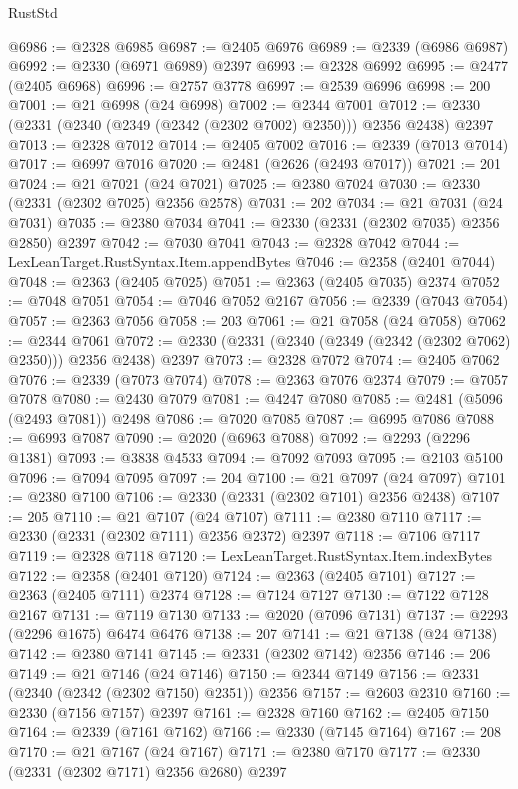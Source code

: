 \begin{lexlean}{RustStd}
\begin{coremodule}
@6986 := @2328 @6985
@6987 := @2405 @6976
@6989 := @2339 (@6986 @6987)
@6992 := @2330 (@6971 @6989) @2397
@6993 := @2328 @6992
@6995 := @2477 (@2405 @6968)
@6996 := @2757 @3778
@6997 := @2539 @6996
@6998 := 200
@7001 := @21 @6998 (@24 @6998)
@7002 := @2344 @7001
@7012 := @2330 (@2331 (@2340 (@2349 (@2342 (@2302 @7002) @2350))) @2356 @2438) @2397
@7013 := @2328 @7012
@7014 := @2405 @7002
@7016 := @2339 (@7013 @7014)
@7017 := @6997 @7016
@7020 := @2481 (@2626 (@2493 @7017))
@7021 := 201
@7024 := @21 @7021 (@24 @7021)
@7025 := @2380 @7024
@7030 := @2330 (@2331 (@2302 @7025) @2356 @2578)
@7031 := 202
@7034 := @21 @7031 (@24 @7031)
@7035 := @2380 @7034
@7041 := @2330 (@2331 (@2302 @7035) @2356 @2850) @2397
@7042 := @7030 @7041
@7043 := @2328 @7042
@7044 := LexLeanTarget.RustSyntax.Item.appendBytes
@7046 := @2358 (@2401 @7044)
@7048 := @2363 (@2405 @7025)
@7051 := @2363 (@2405 @7035) @2374
@7052 := @7048 @7051
@7054 := @7046 @7052 @2167
@7056 := @2339 (@7043 @7054)
@7057 := @2363 @7056
@7058 := 203
@7061 := @21 @7058 (@24 @7058)
@7062 := @2344 @7061
@7072 := @2330 (@2331 (@2340 (@2349 (@2342 (@2302 @7062) @2350))) @2356 @2438) @2397
@7073 := @2328 @7072
@7074 := @2405 @7062
@7076 := @2339 (@7073 @7074)
@7078 := @2363 @7076 @2374
@7079 := @7057 @7078
@7080 := @2430 @7079
@7081 := @4247 @7080
@7085 := @2481 (@5096 (@2493 @7081)) @2498
@7086 := @7020 @7085
@7087 := @6995 @7086
@7088 := @6993 @7087
@7090 := @2020 (@6963 @7088)
@7092 := @2293 (@2296 @1381)
@7093 := @3838 @4533
@7094 := @7092 @7093
@7095 := @2103 @5100
@7096 := @7094 @7095
@7097 := 204
@7100 := @21 @7097 (@24 @7097)
@7101 := @2380 @7100
@7106 := @2330 (@2331 (@2302 @7101) @2356 @2438)
@7107 := 205
@7110 := @21 @7107 (@24 @7107)
@7111 := @2380 @7110
@7117 := @2330 (@2331 (@2302 @7111) @2356 @2372) @2397
@7118 := @7106 @7117
@7119 := @2328 @7118
@7120 := LexLeanTarget.RustSyntax.Item.indexBytes
@7122 := @2358 (@2401 @7120)
@7124 := @2363 (@2405 @7101)
@7127 := @2363 (@2405 @7111) @2374
@7128 := @7124 @7127
@7130 := @7122 @7128 @2167
@7131 := @7119 @7130
@7133 := @2020 (@7096 @7131)
@7137 := @2293 (@2296 @1675) @6474 @6476
@7138 := 207
@7141 := @21 @7138 (@24 @7138)
@7142 := @2380 @7141
@7145 := @2331 (@2302 @7142) @2356
@7146 := 206
@7149 := @21 @7146 (@24 @7146)
@7150 := @2344 @7149
@7156 := @2331 (@2340 (@2342 (@2302 @7150) @2351)) @2356
@7157 := @2603 @2310
@7160 := @2330 (@7156 @7157) @2397
@7161 := @2328 @7160
@7162 := @2405 @7150
@7164 := @2339 (@7161 @7162)
@7166 := @2330 (@7145 @7164)
@7167 := 208
@7170 := @21 @7167 (@24 @7167)
@7171 := @2380 @7170
@7177 := @2330 (@2331 (@2302 @7171) @2356 @2680) @2397

\end{coremodule}
\end{lexlean}
